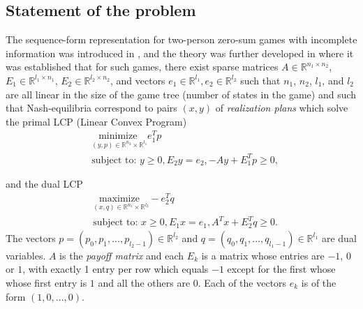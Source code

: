\documentclass{article}
\begin{document}
\subsection{Statement of the problem}
The sequence-form representation for two-person zero-sum games with
incomplete information was introduced in
\cite{koller1992complexity}, and the theory was further developed in
\cite{koller1994fast,von1996efficient,vonequilibrium} where it was
established that for such games, there exist sparse matrices
$A \in \mathbb{R}^{n_1 \times n_2}$, $E_1 \in \mathbb{R}^{l_1 \times
  n_1}$, $E_2 \in \mathbb{R}^{l_2 \times n_2}$, and vectors $e_1 \in
\mathbb{R}^{l_1}, e_2 \in \mathbb{R}^{l_2}$ such that $n_1$, $n_2$,
$l_1$, and $l_2$ are all linear in the size of the game tree (number
of states in the game) and such that Nash-equilibria correspond to
pairs $(x, y)$ of \textit{realization plans} which solve the primal
LCP (Linear Convex Program)
\begin{equation}
  \begin{aligned}
    &\underset{(y,p) \in \mathbb{R}^{n_2} \times
     \mathbb{R}^{l_1}}{\text{minimize }}e_1^Tp\\
    &\text{subject to: } y \ge 0, E_2y = e_2,
    -Ay + E_1^Tp \geq 0,
  \end{aligned}
  \label{eq:primal_pb}
\end{equation}

and the dual LCP
\begin{equation}
  \begin{aligned}
    &\underset{(x,q) \in \mathbb{R}^{n_1} \times
      \mathbb{R}^{l_2}}{\text{maximize }}-e_2^Tq\\
    &\text{subject to: } x \ge
    0, E_1x = e_1, A^Tx + E_2^Tq \geq 0.
  \end{aligned}
  \label{eq:dual_pb}
\end{equation}
The vectors $p = (p_0, p_1, ..., p_{l_2 - 1}) \in \mathbb{R}^{l_2}$
and $q = (q_0, q_1, ..., q_{l_1 - 1}) \in \mathbb{R}^{l_1}$ are dual
variables. 
$A$ is the \textit{payoff matrix} and each $E_k$ is a matrix whose
entries are $-1$, $0$ or $1$, with exactly 1 entry per row which
equals $-1$ except for the first whose whose first entry is $1$ and all
the others are $0$. Each of the vectors $e_k$ is of the form $(1, 0,
..., 0)$.
\end{document}
